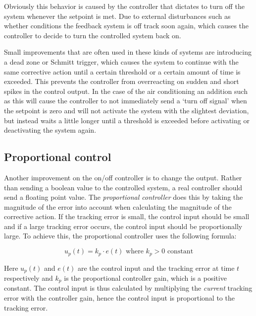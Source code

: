 Obviously this behavior is caused by the controller that dictates to turn off the system whenever the setpoint is met. Due to external disturbances such as whether conditions the feedback system is off track soon again, which causes the controller to decide to turn the controlled system back on.

Small improvements that are often used in these kinds of systems are introducing a dead zone or Schmitt trigger, which causes the system to continue with the same corrective action until a certain threshold or a certain amount of time is exceeded. This prevents the controller from overreacting on sudden and short spikes in the control output. In the case of the air conditioning an addition such as this will cause the controller to not immediately send a `turn off signal' when the setpoint is zero and will not activate the system with the slightest deviation, but instead waits a little longer until a threshold is exceeded before activating or deactivating the system again.

\subsection{Proportional control}
\label{subsec:prop-control}
Another improvement on the on/off controller is to change the output. Rather than sending a boolean value to the controlled system, a real controller should send a floating point value. The \textit{proportional controller} does this by taking the magnitude of the error into account when calculating the magnitude of the corrective action. If the tracking error is small, the control input should be small and if a large tracking error occurs, the control input should be proportionally large. To achieve this, the proportional controller uses the following formula:

\begin{equation} \label{eq:proportional-control}
u_p(t) = k_p \cdot e(t) \text{\ \ \ \ where } k_p > 0 \text{ constant}
\end{equation} 

Here $u_p(t)$ and $e(t)$ are the control input and the tracking error at time $t$ respectively and $k_p$ is the proportional controller gain, which is a positive constant. The control input is thus calculated by multiplying the \emph{current} tracking error with the controller gain, hence the control input is proportional to the tracking error.

